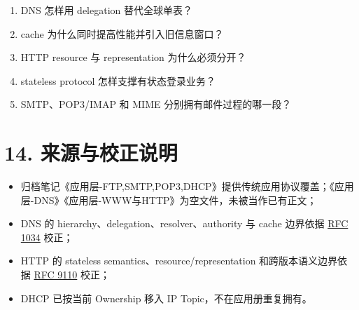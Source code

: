\documentclass[UTF8,fontset=none,11pt,a4paper]{ctexart}
\providecommand{\tightlist}{\setlength{\itemsep}{0pt}\setlength{\parskip}{0pt}}
\begin{document}
\begin{enumerate}
\def\labelenumi{\arabic{enumi}.}
\tightlist
\item
  DNS 怎样用 delegation 替代全球单表？
\item
  cache 为什么同时提高性能并引入旧信息窗口？
\item
  HTTP resource 与 representation 为什么必须分开？
\item
  stateless protocol 怎样支撑有状态登录业务？
\item
  SMTP、POP3/IMAP 和 MIME 分别拥有邮件过程的哪一段？
\end{enumerate}

\section{14.
来源与校正说明}\label{14-ux6765ux6e90ux4e0eux6821ux6b63ux8bf4ux660e}

\begin{itemize}
\tightlist
\item
  归档笔记《应用层-FTP,SMTP,POP3,DHCP》提供传统应用协议覆盖；《应用层-DNS》《应用层-WWW与HTTP》为空文件，未被当作已有正文；
\item
  DNS 的 hierarchy、delegation、resolver、authority 与 cache 边界依据
  \href{https://www.rfc-editor.org/rfc/rfc1034.html}{RFC 1034} 校正；
\item
  HTTP 的 stateless semantics、resource/representation
  和跨版本语义边界依据
  \href{https://www.rfc-editor.org/rfc/rfc9110.html}{RFC 9110} 校正；
\item
  DHCP 已按当前 Ownership 移入 IP Topic，不在应用册重复拥有。
\end{itemize}
\end{document}
